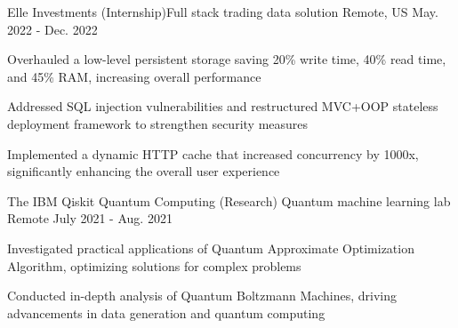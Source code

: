 \begin{cventries}
  \cventry
    {Elle Investments}
    {(Internship)Full stack trading data solution}
    {Remote, US}
    {May. 2022 - Dec. 2022}
    {
      \begin{cvitems}
          \item {Overhauled a low-level persistent storage saving 20\% write time, 40\% read time, and 45\% RAM, increasing overall performance}
          \item {Addressed SQL injection vulnerabilities and restructured MVC+OOP stateless deployment framework to strengthen security measures}
          \item {Implemented a dynamic HTTP cache that increased concurrency by 1000x, significantly enhancing the overall user experience}
      \end{cvitems}
    }

  \cventry
    {The IBM Qiskit Quantum Computing}
    {(Research) Quantum machine learning lab}
    {Remote}
    {July 2021 - Aug. 2021}
    {
      \begin{cvitems}
        \item {Investigated practical applications of Quantum Approximate Optimization Algorithm, optimizing solutions for complex problems}
        \item {Conducted in-depth analysis of Quantum Boltzmann Machines, driving advancements in data generation and quantum computing}
      \end{cvitems}
    }

  \begin{comment}
  \cventry
    {Correlation between Fama-French factors and business cycles}
    {(Research) Timing strategy based on spread curve inversion, second author}
    {Remote}
    {June 2021 - PRESENT}
    {
      \begin{cvitems}
        \item {Advised by Dr. Arnav Sheth from MIT}
        \item {Developed a probit-based recession forecasting model, achieving 70\% accuracy, which contributed to a 10\% annualized return}
        \item {Analyzed business cycles through Fama-French factors using ex-ante and ex-post evaluation methods, confirming the model's validity}
      \end{cvitems}
    }


\end{comment}
\end{cventries}
